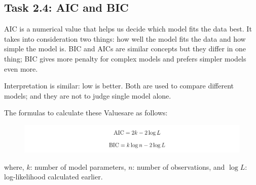\documentclass[12pt,a4paper]{article}
\begin{document}

\subsection*{Task 2.4: AIC and BIC}

AIC is a numerical value that helps us decide which 
model fits the data best. It takes into consideration 
two things: how well the model fits the data and 
how simple the model is. BIC and AICs are similar concepts but they differ in one thing; BIC gives more penalty 
for complex models and prefers simpler models even more. %

Interpretation is similar: low is better. 
Both are used to compare different models; and 
they are not to judge single model alone.

The formulas to calculate these Valuesare as follows:


\begin{figure}[H]
  \centering
  \includegraphics[width=\textwidth]{p6.png}
\end{figure}


where, $k$: number of model parameters, $n$: number of observations, and 
$\log L$: log-likelihood calculated earlier. 


\end{document}
